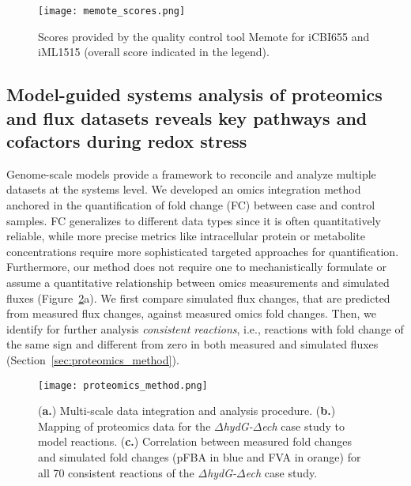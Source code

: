 \begin{figure}[h]
    \caption[Quality assesement scores for iCBI655 model]{Scores provided by the quality control tool Memote\citep{lieven2018} for iCBI655 and iML1515 (overall score indicated in the legend).}%
    \centering
    \texttt{[image: memote\_scores.png]}
    \label{fig:memote}
\end{figure}

\subsection{Model-guided systems analysis of proteomics and flux datasets reveals key pathways and cofactors during redox stress} \label{sec:omics_analysis}

Genome-scale models provide a framework to reconcile and analyze multiple datasets at the systems level.
We developed an omics integration method anchored in the quantification of fold change (FC) between case and control samples. FC generalizes to different data types since it is often quantitatively reliable, while more precise metrics like intracellular protein or metabolite concentrations require more sophisticated targeted approaches for quantification. Furthermore, our method does not require one to mechanistically formulate or assume a quantitative relationship between omics measurements and simulated fluxes (Figure~\ref{fig:proteomics}a).
We first compare simulated flux changes, that are predicted from measured flux changes, against measured omics fold changes.
Then, we identify for further analysis \emph{consistent reactions}, i.e., reactions with fold change of the same sign and different from zero in both measured and simulated fluxes (Section~\ref{sec:proteomics_method}).

\begin{figure}[h]
    \caption[Multi-scale data integration procedure]{(\textbf{a.}) Multi-scale data integration and analysis procedure. (\textbf{b.}) Mapping of proteomics data for the \textit{$\Delta$hydG-$\Delta$ech} case study to model reactions. (\textbf{c.}) Correlation between measured fold changes and simulated fold changes (pFBA in blue and FVA in orange) for all 70 consistent reactions of the \textit{$\Delta$hydG-$\Delta$ech} case study.}
    \centering
    \texttt{[image: proteomics\_method.png]}
    \label{fig:proteomics}
\end{figure}

